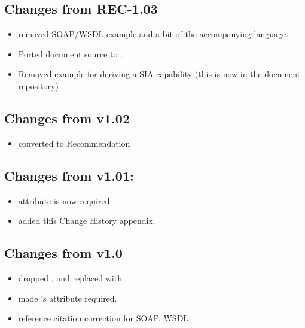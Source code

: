 \documentclass[11pt,a4paper]{ivoa}
\begin{document}
\subsection{Changes from REC-1.03}

\begin{itemize}
\item removed SOAP/WSDL example and a bit of the accompanying language.
\item Ported document source to \ivoatex.
\item Removed example for deriving a SIA capability (this is now
in the document repository)
\end{itemize}

\subsection{Changes from v1.02}
\begin{itemize}
  \item converted to Recommendation
\end{itemize}

\subsection{Changes from v1.01:}
\begin{itemize}
  \item {} attribute is now required.
  \item added this Change History appendix.
\end{itemize}

\subsection{Changes from v1.0}
\begin{itemize}
  \item dropped ,  and replaced
       with .
  \item made 's  attribute
       required.
  \item reference citation correction for SOAP, WSDL
\end{itemize}




\end{document}
